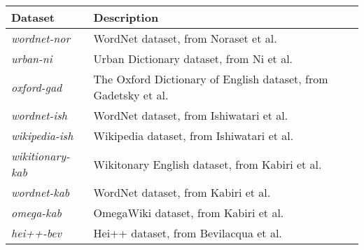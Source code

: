 \begin{tabular}{|l|l|}
    \hline
    Dataset                  & Description                                                                                     \\
    \hline
    \textit{wordnet-nor}     & WordNet dataset, from Noraset et al. \cite{noraset_definition_2016}                             \\
    \textit{urban-ni}        & Urban Dictionary dataset, from Ni et al. \cite{ni_learning_2017}                                \\
    \textit{oxford-gad}      & The Oxford Dictionary of English dataset, from Gadetsky et al. \cite{gadetsky_conditional_2018} \\
    \textit{wordnet-ish}     & WordNet dataset, from Ishiwatari et al. \cite{ishiwatari_learning_2019}                         \\
    \textit{wikipedia-ish}   & Wikipedia dataset, from Ishiwatari et al. \cite{ishiwatari_learning_2019}                       \\
    \textit{wikitionary-kab} & Wikitonary English dataset, from Kabiri et al. \cite{kabiri_evaluating_2020}                    \\
    \textit{wordnet-kab}     & WordNet dataset, from Kabiri et al. \cite{kabiri_evaluating_2020}                               \\
    \textit{omega-kab}       & OmegaWiki dataset, from Kabiri et al. \cite{kabiri_evaluating_2020}                             \\
    \textit{hei++-bev}       & Hei++ dataset, from Bevilacqua et al. \cite{bevilacqua_generationary_2020}                      \\
    \hline
\end{tabular}
